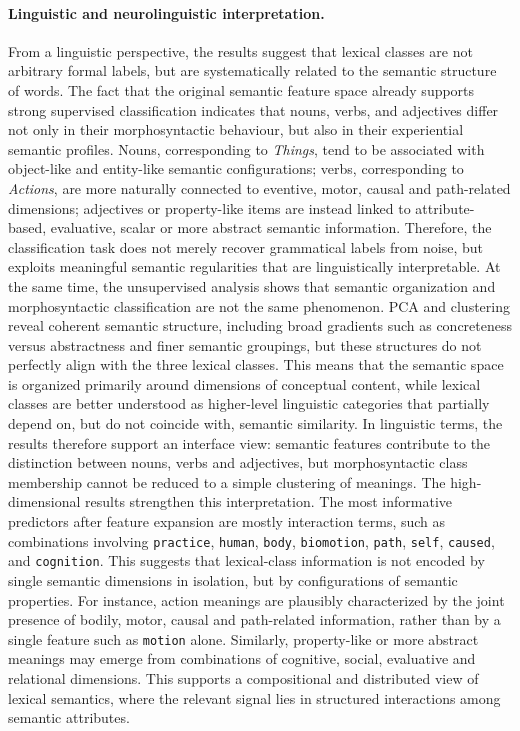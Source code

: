 \documentclass{ipgpmaster}
\begin{document}
\paragraph{Linguistic and neurolinguistic interpretation.}
From a linguistic perspective, the results suggest that lexical classes are not arbitrary formal labels, but are systematically related to the semantic structure of words. The fact that the original semantic feature space already supports strong supervised classification indicates that nouns, verbs, and adjectives differ not only in their morphosyntactic behaviour, but also in their experiential semantic profiles. Nouns, corresponding to \emph{Things}, tend to be associated with object-like and entity-like semantic configurations; verbs, corresponding to \emph{Actions}, are more naturally connected to eventive, motor, causal and path-related dimensions; adjectives or property-like items are instead linked to attribute-based, evaluative, scalar or more abstract semantic information. Therefore, the classification task does not merely recover grammatical labels from noise, but exploits meaningful semantic regularities that are linguistically interpretable.
At the same time, the unsupervised analysis shows that semantic organization and morphosyntactic classification are not the same phenomenon. PCA and clustering reveal coherent semantic structure, including broad gradients such as concreteness versus abstractness and finer semantic groupings, but these structures do not perfectly align with the three lexical classes. This means that the semantic space is organized primarily around dimensions of conceptual content, while lexical classes are better understood as higher-level linguistic categories that partially depend on, but do not coincide with, semantic similarity. In linguistic terms, the results therefore support an interface view: semantic features contribute to the distinction between nouns, verbs and adjectives, but morphosyntactic class membership cannot be reduced to a simple clustering of meanings. The high-dimensional results strengthen this interpretation. The most informative predictors after feature expansion are mostly interaction terms, such as combinations involving \texttt{practice}, \texttt{human}, \texttt{body}, \texttt{biomotion}, \texttt{path}, \texttt{self}, \texttt{caused}, and \texttt{cognition}. This suggests that lexical-class information is not encoded by single semantic dimensions in isolation, but by configurations of semantic properties. For instance, action meanings are plausibly characterized by the joint presence of bodily, motor, causal and path-related information, rather than by a single feature such as \texttt{motion} alone. Similarly, property-like or more abstract meanings may emerge from combinations of cognitive, social, evaluative and relational dimensions. This supports a compositional and distributed view of lexical semantics, where the relevant signal lies in structured interactions among semantic attributes.
\end{document}
